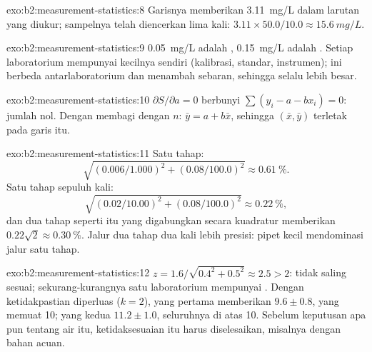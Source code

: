\begin{solution}{exo:b2:measurement-statistics:8}
Garisnya memberikan \qty{3.11}{mg/L} dalam larutan yang diukur; sampelnya
telah diencerkan lima kali:
$3.11 \times 50.0/10.0 \approx \qty{15.6}{mg/L}$.
\end{solution}

\begin{solution}{exo:b2:measurement-statistics:9}
\qty{0.05}{mg/L} adalah , \qty{0.15}{mg/L} adalah .
Setiap laboratorium mempunyai  kecilnya sendiri (kalibrasi, standar,
instrumen);  ini berbeda antarlaboratorium dan menambah sebaran,
sehingga  selalu lebih besar.
\end{solution}

\begin{solution}{exo:b2:measurement-statistics:10}
$\partial S/\partial a = 0$ berbunyi $\sum(y_i - a - bx_i) = 0$: jumlah  nol. Dengan membagi dengan
$n$: $\bar y = a + b\bar x$, sehingga $(\bar x, \bar y)$ terletak pada garis itu.
\end{solution}

\begin{solution}{exo:b2:measurement-statistics:11}
Satu tahap:
\[\sqrt{(0.006/1.000)^2 + (0.08/100.0)^2} \approx 0.61~\%.\]
Satu tahap sepuluh kali:
\[\sqrt{(0.02/10.00)^2 + (0.08/100.0)^2} \approx 0.22~\%,\]
dan dua tahap seperti itu yang digabungkan secara kuadratur memberikan
$0.22\sqrt2 \approx 0.30~\%$. Jalur dua tahap dua kali lebih presisi: pipet
kecil mendominasi jalur satu tahap.
\end{solution}

\begin{solution}{exo:b2:measurement-statistics:12}
$z = 1.6/\sqrt{0.4^2 + 0.5^2} \approx 2.5 > 2$: tidak saling sesuai;
sekurang-kurangnya satu laboratorium mempunyai . Dengan ketidakpastian
diperluas ($k = 2$), yang pertama memberikan $9.6 \pm 0.8$, yang memuat 10;
yang kedua $11.2 \pm 1.0$, seluruhnya di atas 10. Sebelum keputusan apa pun
tentang air itu, ketidaksesuaian itu harus diselesaikan, misalnya dengan
bahan acuan.
\end{solution}

